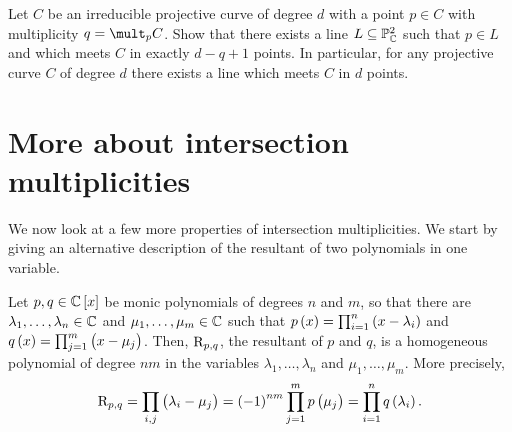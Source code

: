 \begin{exercise**}
Let $ C $ be an irreducible projective curve of degree $ d $ with a point $ p \in C $ with multiplicity $ q = \mult_p C $. Show that there exists a line $ L \subseteq \mathbb{P}_{\mathbb{C}}^2 $ such that $ p \in L $ and which meets $ C $ in exactly $ d - q + 1 $ points. In particular, for any projective curve $ C $ of degree $ d $ there exists a line which meets $ C $ in $ d $ points.
\end{exercise**}

\pagebreak

\section{More about intersection multiplicities}

We now look at a few more properties of intersection multiplicities. We start by giving an alternative description of the resultant of two polynomials in one variable.

\begin{lemma}
\label{lem:12.1}
Let $ p, q \in \CC\sbr{x} $ be monic polynomials of degrees $ n $ and $ m $, so that there are $ \lambda_1, \dots, \lambda_n \in \mathbb{C} $ and $ \mu_1, \dots, \mu_m \in \mathbb{C} $ such that $ p\br{x} = \prod_{i = 1}^n \br{x - \lambda_i} $ and $ q\br{x} = \prod_{j = 1}^m \br{x - \mu_j} $. Then, $ \mathrm{R}_{p, q} $, the resultant of $ p $ and $ q $, is a homogeneous polynomial of degree $ nm $ in the variables $ \lambda_1, \dots, \lambda_n $ and $ \mu_1, \dots, \mu_m $. More precisely,
$$ \R_{p, q} = \prod_{i, j}\br{\lambda_i - \mu_j} = \br{-1}^{nm}\prod_{j = 1}^m p\br{\mu_j} = \prod_{i = 1}^n q\br{\lambda_i}. $$
\end{lemma}

